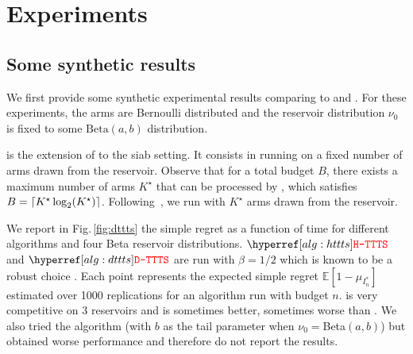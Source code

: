 \section{Experiments}\label{sec:dttts.experiments}

\subsection{Some synthetic results}\label{sec:dttts.experiments.synthetic}
We first provide some synthetic experimental results comparing \DTTTS{} to \Hyperband{} and \ISHA{}. For these experiments, the arms are Bernoulli distributed and the reservoir distribution $\nu_0$ is fixed to some $\text{Beta}(a,b)$ distribution. 

\ISHA is the extension of \SHA to the \gls{siab} setting. It consists in running \SHA{} on a fixed number of arms drawn from the reservoir. Observe that for a total budget $B$, there exists a maximum number of arms $K^\star$ that can be processed by \SHA{}, which satisfies $B = \lceil K^\star\log_2(K^\star)\rceil$. Following~\cite{aziz2018infinite}, we run \ISHA with $K^\star$ arms drawn from the reservoir. %

We report in Fig.\,\ref{fig:dttts} the simple regret as a function of time for different algorithms and four Beta reservoir distributions. $\HTTTS$ and $\DTTTS$ are run with $\beta=1/2$ which is known to be a robust choice \citep{russo2016ttts}. Each point represents the expected simple regret $\mathbb{E}[1 - \mu_{I_n^*}]$ estimated over 1000 replications for an algorithm run with budget $n$. \DTTTS is very competitive on 3 reservoirs and \HTTTS is sometimes better, sometimes worse than \Hyperband. We also tried the \SiRI algorithm \citep{carpentier2015siri} (with $b$ as the tail parameter when $\nu_0=$Beta$(a,b)$) but obtained worse performance and therefore do not report the results.

